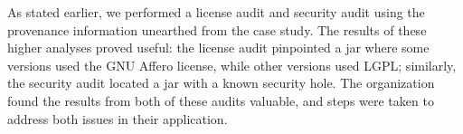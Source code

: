 As stated earlier, we performed a license audit and security audit using
the provenance information unearthed from the case study.  The results of
these higher analyses proved useful: the license audit pinpointed a jar
where some versions used the GNU Affero license, while other versions used
LGPL; similarly, the security audit located a jar with a known security
hole.  The organization found the results from both of these audits
valuable, and steps were taken to address both issues in their application.
